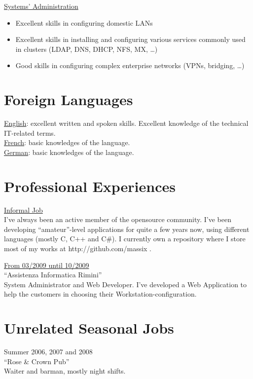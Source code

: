 \documentclass[margin]{res}
\begin{document}
\begin{resume}
	\underline{Systems' Administration}
		\begin{itemize}
			\item Excellent skills in configuring domestic LANs
			\item Excellent skills in installing and configuring various services commonly used
			in clusters (LDAP, DNS, DHCP, NFS, MX, \ldots)
			\item Good skills in configuring complex enterprise networks (VPNs, bridging, \ldots)
		\end{itemize}

\section{Foreign Languages} 
\underline{English}: excellent written and spoken skills. Excellent knowledge of the technical 
IT-related terms. \\
\underline{French}: basic knowledges of the language. \\
\underline{German}: basic knowledges of the language. \\
 

\section{Professional Experiences}
\underline{Informal Job} \\
I've always been an active member of the opensource community. I've been developing ``amateur''-level
applications for quite a few years now, using different languages (mostly C, C++ and C\#). I currently
own a repository where I store most of my works at http://github.com/massix . \\
\vspace{2mm}

\underline{From 03/2009 until 10/2009} \\
``Assistenza Informatica Rimini'' \\
System Administrator and Web Developer. I've developed a Web Application to
help the customers in choosing their Workstation-configuration.

\section{Unrelated Seasonal Jobs}
Summer 2006, 2007 and 2008 \\
``Rose \& Crown Pub'' \\
Waiter and barman, mostly night shifts.


\end{resume}
\end{document}

